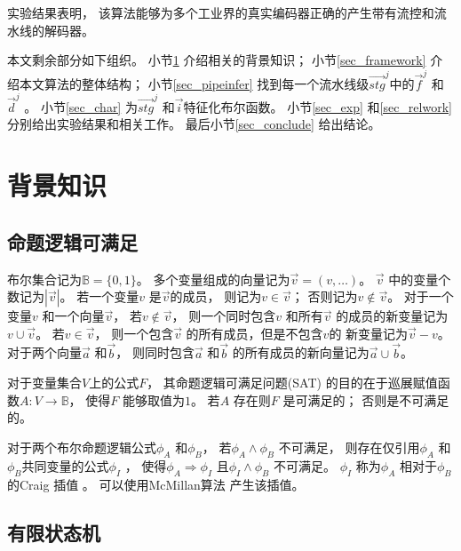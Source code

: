 实验结果表明，
该算法能够为多个工业界的真实编码器正确的产生带有流控和流水线的解码器。

本文剩余部分如下组织。
小节\ref{sec_prem} 介绍相关的背景知识；
小节\ref{sec_framework} 介绍本文算法的整体结构；
小节\ref{sec_pipeinfer} 找到每一个流水线级$\vec{stg}^j$中的$\vec{f}^j$ 和$\vec{d}^j$ 。
小节\ref{sec_char} 为$\vec{stg}^j$ 和$\vec{i}$特征化布尔函数。
小节\ref{sec_exp} 和\ref{sec_relwork} 分别给出实验结果和相关工作。
最后小节\ref{sec_conclude} 给出结论。


\section{背景知识}\label{sec_prem}




\subsection{命题逻辑可满足}\label{subsec_SAT}
布尔集合记为$\mathbb{B}=\{0,1\}$。
多个变量组成的向量记为$\vec{v}=(v,\dots)$。
$\vec{v}$ 中的变量个数记为$|\vec{v}|$。
若一个变量$v$ 是$\vec{v}$的成员，
则记为$v\in\vec{v}$；
否则记为$v\notin\vec{v}$。
对于一个变量$v$ 和一个向量$\vec{v}$，
若$v\notin\vec{v}$，
则一个同时包含$v$ 和所有$\vec{v}$ 的成员的新变量记为$v\cup\vec{v}$。
若$v\in \vec{v}$，
则一个包含$\vec{v}$ 的所有成员，但是不包含$v$的
新变量记为$\vec{v}-v$。
对于两个向量$\vec{a}$ 和$\vec{b}$，
则同时包含$\vec{a}$ 和$\vec{b}$ 的所有成员的新向量记为$\vec{a}\cup\vec{b}$。

对于变量集合$V$上的公式$F$，
其命题逻辑可满足问题(SAT)
的目的在于巡展赋值函数$A:V\to \mathbb{B}$，
使得$F$ 能够取值为$1$。
若$A$ 存在则$F$ 是可满足的；
否则是不可满足的。

对于两个布尔命题逻辑公式$\phi_A$ 和$\phi_B$，
若$\phi_A\wedge \phi_B$ 不可满足，
则存在仅引用$\phi_A$ 和$\phi_B$共同变量的公式$\phi_I$ ，
使得$\phi_A\Rightarrow \phi_I$
且$\phi_I\wedge \phi_B$ 不可满足。
$\phi_I$ 称为$\phi_A$ 相对于$\phi_B$的Craig 插值\cite{Craig} 。
可以使用McMillan算法\cite{interp_McMillan} 产生该插值。




\subsection{有限状态机}\label{subsec_fsm}



